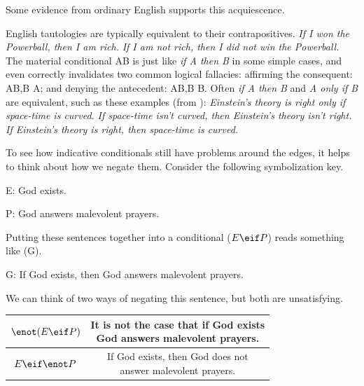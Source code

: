 Some evidence from ordinary English supports this acquiescence.

\begin{observation}
  \begin{outline}[enumerate]
    \1 English tautologies are typically equivalent to their
    contrapositives.
    \2 \emph{If I won the Powerball, then I am rich.}
    \2 \emph{If I am not rich, then I did not win the Powerball.}
    \1 The material conditional  A\eif B is just like \emph{if A then B}
    in some simple cases, and even correctly invalidates two common logical
    fallacies:
    \2 affirming the consequent: A\eif B,B \therefore A; and
    \2 denying the antecedent: A\eif B,\enot B \therefore \enot B.
    \1 Often \emph{if A then B} and \emph{A only if B} are equivalent, such as
    these examples (from \cite[][p. 155]{Smi20}):
    \2 \emph{Einstein's theory is right only if space-time is curved.}
    \2 \emph{If space-time isn't curved, then Einstein's theory isn't right.}
    \2 \emph{If Einstein's theory is right, then space-time is curved.}
  \end{outline}
\end{observation}

To see how indicative conditionals still have problems around the edges, it
helps to think about how we negate them. Consider the following symbolization
key.

\begin{argument}
\item[E:] God exists. 
\item[P:] God answers malevolent prayers.
\end{argument}

Putting these sentences together into a conditional ($E\eif P$) reads something
like (G).

\begin{argument}
\item[G:] If God exists, then God answers malevolent prayers.
\end{argument}

We can think of two ways of negating this sentence, but both are unsatisfying.

\begin{center}
  \begin{tabular}{|c|c|}
    \hline
    $\enot(E\eif P)$ & \makecell{It is not the case that if God exists\\God answers malevolent prayers.} \\
    \hline
    $E\eif\enot P$ & \makecell{If God exists, then God does not\\answer malevolent prayers.} \\
    \hline
  \end{tabular}
\end{center}

